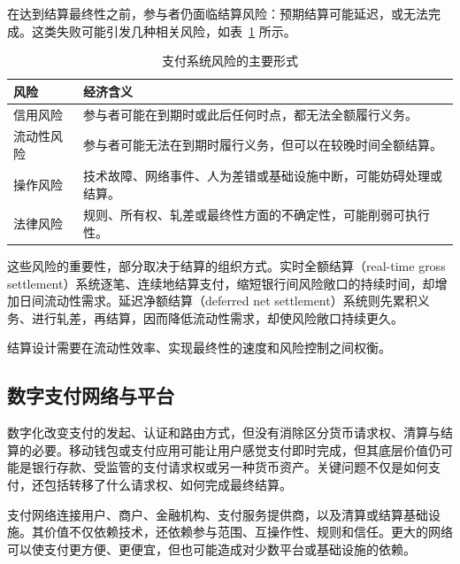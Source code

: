 在达到结算最终性之前，参与者仍面临结算风险：预期结算可能延迟，或无法完成。这类失败可能引发几种相关风险，如表~\ref{tab:ch2-payment-risk} 所示。

\begin{table}[H]
\centering
\caption{支付系统风险的主要形式}
\label{tab:ch2-payment-risk}

\renewcommand{\arraystretch}{1.2}

\begin{tabularx}{\textwidth}{
    @{}
    >{\raggedright\arraybackslash}p{3.0cm}
    >{\raggedright\arraybackslash}X
    @{}
}
\toprule
\textbf{风险}
& \textbf{经济含义} \\
\midrule


信用风险
& 参与者可能在到期时或此后任何时点，都无法全额履行义务。 \\

流动性风险
& 参与者可能无法在到期时履行义务，但可以在较晚时间全额结算。 \\

操作风险
& 技术故障、网络事件、人为差错或基础设施中断，可能妨碍处理或结算。 \\

法律风险
& 规则、所有权、轧差或最终性方面的不确定性，可能削弱可执行性。 \\

\bottomrule
\end{tabularx}
\end{table}

这些风险的重要性，部分取决于结算的组织方式。实时全额结算（real-time gross settlement）系统逐笔、连续地结算支付，缩短银行间风险敞口的持续时间，却增加日间流动性需求。延迟净额结算（deferred net settlement）系统则先累积义务、进行轧差，再结算，因而降低流动性需求，却使风险敞口持续更久。

结算设计需要在流动性效率、实现最终性的速度和风险控制之间权衡。

\subsection{数字支付网络与平台}

数字化改变支付的发起、认证和路由方式，但没有消除区分货币请求权、清算与结算的必要。移动钱包或支付应用可能让用户感觉支付即时完成，但其底层价值仍可能是银行存款、受监管的支付请求权或另一种货币资产。关键问题不仅是如何支付，还包括转移了什么请求权、如何完成最终结算。

支付网络连接用户、商户、金融机构、支付服务提供商，以及清算或结算基础设施。其价值不仅依赖技术，还依赖参与范围、互操作性、规则和信任。更大的网络可以使支付更方便、更便宜，但也可能造成对少数平台或基础设施的依赖。

